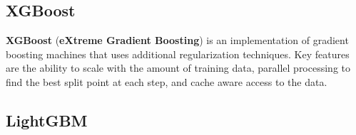 \subsection{XGBoost}

\textbf{XGBoost} (\textbf{eXtreme Gradient Boosting}) is an implementation of gradient boosting machines that uses additional regularization techniques. Key features are the ability to scale with the amount of training data, parallel processing to find the best split point at each step, and cache aware access to the data.

\subsection{LightGBM}